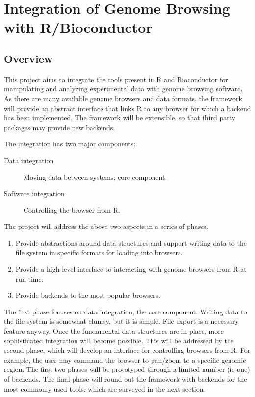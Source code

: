 \documentclass{article}
\begin{document}
\section*{Integration of Genome Browsing with R/Bioconductor}

\subsection*{Overview}
\label{sec:overview}

This project aims to integrate the tools present in R and Bioconductor
for manipulating and analyzing experimental data with genome browsing
software. As there are many available genome browsers and data
formats, the framework  will provide an abstract interface that links
R to any browser for which a backend has been implemented. The
framework will be extensible, so that third party packages may provide
new backends.

The integration has two major components:
\begin{description}
\item[Data integration] Moving data between systems; core component.
\item[Software integration] Controlling the browser from R.
\end{description}

The project will address the above two aspects in a series of phases.
\begin{enumerate}
\item Provide abstractions around data structures and support writing
data to the file system in specific formats for loading into browsers.
\item Provide a high-level interface to interacting with genome
browsers from R at run-time.
\item Provide backends to the most popular browsers. 
\end{enumerate}
The first phase focuses on data integration, the core component.
Writing data to the file system is somewhat clumsy, but it is simple.
File export is a necessary feature anyway. Once the fundamental data
structures are in place, more sophisticated integration will become
possible. This will be addressed by the second phase, which will
develop an interface for controlling browsers from R. For example, the
user may command the browser to pan/zoom to a specific genomic region.
The first two phases will be prototyped through a limited number (ie
one) of backends. The final phase will round out the framework with
backends for the most commonly used tools, which are surveyed in the
next section.
\end{document}
